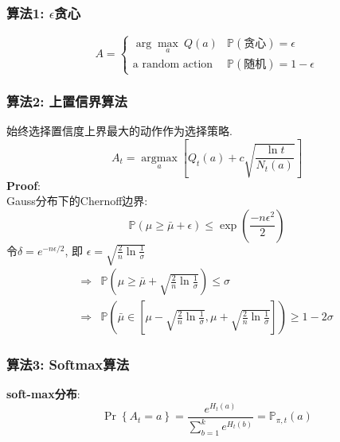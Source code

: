\documentclass{article}
\begin{document}
        \subsubsection{算法1: $\epsilon$贪心}
            \begin{displaymath} A = \left\{ \begin{array}{ll}
                \arg\max_a\ Q(a) & \mathbb{P}(\text{贪心}) = \epsilon\\
                \text{a random action} & \mathbb{P}(\text{随机}) = 1 - \epsilon
            \end{array} \right. \end{displaymath}
            
        \subsubsection{算法2: 上置信界算法}
            始终选择置信度上界最大的动作作为选择策略.
            $$A_{t} = \underset{a}{\operatorname{argmax}}\left[Q_{t}(a)+c \sqrt{\frac{\ln t}{N_{t}(a)}}\right]$$
            \textbf{Proof}:\\
                Gauss分布下的Chernoff边界:
                    $$\mathbb{P}(\mu \geq \bar{\mu}+\epsilon) \leq \exp \left(\frac{-n \epsilon^{2}}{2}\right)$$
                令$\delta = e^{-n \epsilon / 2}$, 即 $\epsilon = \sqrt{\frac{2}{n} \ln \frac{1}{\sigma}}$
                \begin{align*}
                    \Rightarrow & \mathbb{P}\left(\mu \ge \bar{\mu} + \sqrt{\frac{2}{n} \ln \frac{1}{\sigma}} \right) \le \sigma\\
                    \Rightarrow & \mathbb{P}\left(\bar{\mu} \in \left[\mu - \sqrt{\frac{2}{n} \ln \frac{1}{\sigma}}, \mu +  \sqrt{\frac{2}{n} \ln \frac{1}{\sigma}} \right] \right) \ge 1 - 2 \sigma
                \end{align*}
                
        \subsubsection{算法3: Softmax算法}
            \textbf{soft-max分布}:
                $$\operatorname{Pr}\left\{A_{t}=a\right\} = \frac{e^{H_{t}(a)}}{\sum_{b=1}^{k} e^{H_{t}(b)}} = \mathbb{P}_{\pi,t}(a)$$
    
\end{document}
